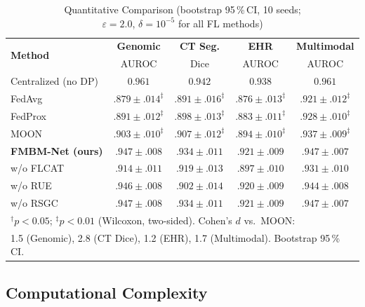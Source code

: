 \documentclass[journal,draftclsnofoot,10pt,onecolumn]{IEEEtran}
\begin{document}
\begin{table}[!t]
\caption{Quantitative Comparison (bootstrap 95\,\%\,CI, 10 seeds;\\
$\varepsilon\!=\!2.0$, $\delta\!=\!10^{-5}$ for all FL methods)}
\label{tab:results}
\centering
\renewcommand{\arraystretch}{1.18}
\setlength{\tabcolsep}{2.8pt}
\begin{tabular}{lcccc}
\toprule
\multirow{2}{*}{\textbf{Method}} &
\textbf{Genomic} & \textbf{CT Seg.} &
\textbf{EHR} & \textbf{Multimodal}\\
& AUROC & Dice & AUROC & AUROC\\
\midrule
Centralized (no DP) & $0.961$ & $0.942$ & $0.938$ & $0.961$\\
\midrule
FedAvg~\cite{mcmahan2017fedavg}
  & $.879{\pm}.014^{\ddagger}$
  & $.891{\pm}.016^{\ddagger}$
  & $.876{\pm}.013^{\ddagger}$
  & $.921{\pm}.012^{\ddagger}$\\
FedProx~\cite{li2020fedprox}
  & $.891{\pm}.012^{\ddagger}$
  & $.898{\pm}.013^{\ddagger}$
  & $.883{\pm}.011^{\ddagger}$
  & $.928{\pm}.010^{\ddagger}$\\
MOON~\cite{li2021moon}
  & $.903{\pm}.010^{\ddagger}$
  & $.907{\pm}.012^{\ddagger}$
  & $.894{\pm}.010^{\ddagger}$
  & $.937{\pm}.009^{\ddagger}$\\
\midrule
\textbf{FMBM-Net (ours)}
  & $\mathbf{.947{\pm}.008}$
  & $\mathbf{.934{\pm}.011}$
  & $\mathbf{.921{\pm}.009}$
  & $\mathbf{.947{\pm}.007}$\\
\quad w/o FLCAT
  & $.914{\pm}.011$
  & $.919{\pm}.013$
  & $.897{\pm}.010$
  & $.931{\pm}.010$\\
\quad w/o RUE
  & $.946{\pm}.008$
  & $.902{\pm}.014$
  & $.920{\pm}.009$
  & $.944{\pm}.008$\\
\quad w/o RSGC
  & $.947{\pm}.008$
  & $.934{\pm}.011$
  & $.921{\pm}.009$
  & $.947{\pm}.007$\\
\bottomrule
\multicolumn{5}{l}{\footnotesize $^{\dagger}p\!<\!0.05$;
$^{\ddagger}p\!<\!0.01$ (Wilcoxon, two-sided). Cohen's $d$ vs.\ MOON:}\\
\multicolumn{5}{l}{\footnotesize 1.5 (Genomic), 2.8 (CT Dice), 1.2 (EHR),
1.7 (Multimodal). Bootstrap 95\,\%\,CI.}
\end{tabular}
\end{table}

\subsection{Computational Complexity}
\end{document}
